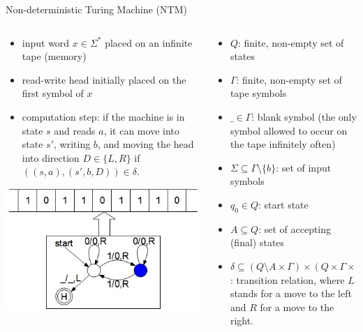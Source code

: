 \begin{frame}{Non-deterministic Turing Machine (NTM)}

	\begin{columns}
		\begin{column}[t]{.50\textwidth}
			\begin{itemize}
				\item \alert{input word} $x\in \Sigma^*$ placed on an \alert{infinite tape} (memory)
				\item read-write head initially placed on the first symbol of $x$
				\item computation step: if the machine is in state $s$ and reads $a$, it can move into state $s'$, writing $b$, and moving the head into direction $D \in \{L,R\}$ if $((s,a),(s',b,D)) \in \delta$.
			\end{itemize}
			\centering
			\includegraphics[scale=0.3]{../img/tm.jpg}
		\end{column}
		\begin{column}[t]{.50\textwidth}
			\begin{itemize}
				\item $Q$: finite, non-empty set of states
				\item $\Gamma$: finite, non-empty set of tape symbols
				\item $\_\in \Gamma$: blank symbol (the only symbol allowed to occur on the tape infinitely often)
				\item $\Sigma\subseteq\Gamma\setminus\{b\}$: set of input symbols
				\item $q_0 \in Q$: start state
				\item $A \subseteq Q$: set of accepting (final) states
				\item $\delta \subseteq (Q \setminus A \times \Gamma) \times (Q \times \Gamma \times \{L,R\})$: transition relation, where $L$ stands for a move to the left and $R$ for a move to the right.
			\end{itemize}
		\end{column}
	\end{columns}

\end{frame}

